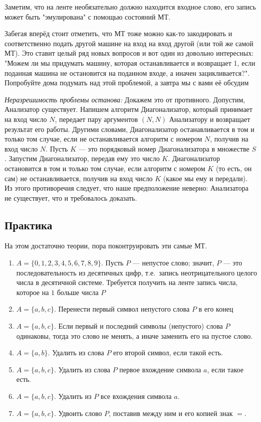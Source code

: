 Заметим, что на ленте необязательно должно находится входное слово, его запись может быть
"эмулирована" с помощью состояний МТ.

\begin{tcolorbox}[colback=blue!5,colframe=blue!75!black, title=Проблема останова]
    Забегая вперёд стоит отметить, что МТ тоже можно как-то закодировать и соответственно подать другой машине на вход
    на вход другой (или той же самой МТ). Это ставит целый ряд новых вопросов и вот один из довольно интересных:
    "Можем ли мы придумать машину, которая останавливается и возвращает 1, если поданная машина не остановится
    на поданном входе, а иначен зацикливается?". Попробуйте дома подумать над этой проблемой, а завтра
    мы с вами её обсудим
\end{tcolorbox}
\textit{Неразрешимость проблемы останова:} Докажем это от противного. Допустим, Анализатор существует. Напишем алгоритм Диагонализатор,
который принимает на вход число $N$, передает пару аргументов $(N,N)$ Анализатору
и возвращает результат его работы. Другими словами, Диагонализатор останавливается в
том и только том случае, если не останавливается алгоритм с номером $N$,
получив на вход число $N$. Пусть $K$ --- это порядковый номер Диагонализатора
в множестве $S$. Запустим Диагонализатор, передав ему это число $K$.
Диагонализатор остановится в том и только том случае, если алгоритм с номером
$K$ (то есть, он сам) не останавливается, получив на вход число $K$
(какое мы ему и передали). Из этого противоречия следует,
что наше предположение неверно: Анализатора не существует,
что и требовалось доказать. 

\subsection*{Практика}
На этом достаточно теории, пора поконтруировать эти самые МТ.
\begin{enumerate}
    \item $A=\{0,1,2,3,4,5,6,7,8,9\}$. Пусть $P$ --- непустое слово;
    значит, $P$ --- это последовательность из десятичных цифр,
    т.е.~запись неотрицательного целого числа в десятичной системе.
    Требуется получить на ленте запись числа, которое на $1$ больше числа $P$
    \item $A=\{a,b,c\}$. Перенести первый символ непустого слова $P$ в его конец
    \item $A=\{a,b,c\}$. Если первый и последний символы (непустого) слова $P$ одинаковы,
    тогда это слово не менять, а иначе заменить его на пустое слово.
    \item $A=\{a,b\}$. Удалить из слова $P$ его второй символ, если такой есть.
    \item $A=\{a,b,c\}$. Удалить из слова $P$ первое вхождение символа $a$, если такое есть.
    \item $A=\{a,b,c\}$. Удалить из $P$ все вхождения символа $a$.
    \item $A=\{a,b,c\}$. Удвоить слово $P$, поставив между ним и его копией знак $=$.
\end{enumerate}
\newpage
